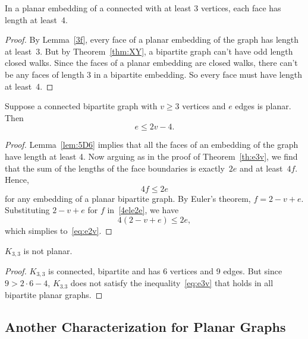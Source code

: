 \begin{lemma}\label{lem:5D6}
In a planar embedding of a connected  with at
least 3 vertices, each face has length at least~4.
\end{lemma}

\begin{proof}
  By Lemma~\ref{3f}, every face of a planar embedding of the graph has
  length at least~3.  But by Theorem~\ref{thm:XY}, a bipartite graph can't
  have odd length closed walks.
  Since the faces of a planar embedding are closed walks, there can't be
  any faces of length 3 in a bipartite embedding.   So every face must have
  length at least~4.
\end{proof}

\begin{theorem}\label{th:e2v}
Suppose a connected bipartite graph with $v \geq 3$ vertices and $e$ edges
is planar.  Then
\begin{equation}\label{eq:e2v}
    e \leq 2v-4.
\end{equation}
\end{theorem}

\begin{proof}
  Lemma~\ref{lem:5D6} implies that all the faces of an embedding of the
  graph have length at least 4.  Now arguing as in the proof of
  Theorem~\ref{th:e3v}, we find that the sum of the lengths of the face
  boundaries is exactly~$2e$ and at least~$4f$.  Hence,
\begin{equation}\label{4ele2e}
    4f \le 2e
\end{equation}
for any embedding of a planar bipartite graph.  By Euler's theorem,
$f=2-v+e$.  Substituting $2-v+e$ for $f$ in~\eqref{4ele2e}, we have
\[
4(2-v+e) \leq 2e,
\]
which simplies to~\eqref{eq:e2v}.
\end{proof}

\begin{corollary}\label{cor:K33-nonplanar} %
$K_{3, 3}$ is not planar.
\end{corollary}

\begin{proof}
  $K_{3,3}$ is connected, bipartite and has 6 vertices and 9 edges.  But
  since $ 9 > 2 \cdot 6-4$, $K_{3.3}$ does not satisfy the
  inequality~\eqref{eq:e3v} that holds in all bipartite planar graphs.
\end{proof}

\subsection{Another Characterization for Planar Graphs}

